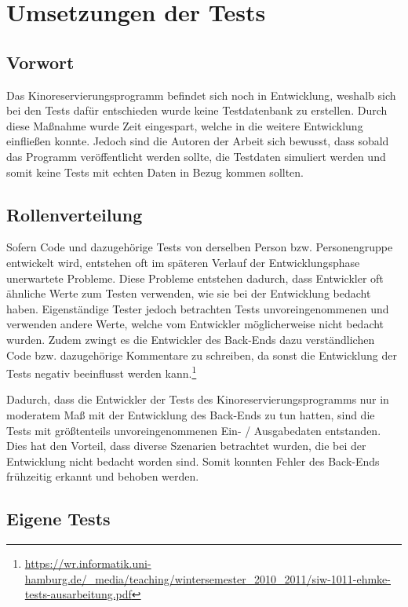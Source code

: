 \section{Umsetzungen der Tests}
\authorsection{\authorRF}

\subsection{Vorwort}

Das Kinoreservierungsprogramm befindet sich noch in Entwicklung, weshalb sich bei den Tests dafür entschieden wurde keine Testdatenbank zu erstellen.
Durch diese Maßnahme wurde Zeit eingespart, welche in die weitere Entwicklung einfließen konnte.
Jedoch sind die Autoren der Arbeit sich bewusst, dass sobald das Programm veröffentlicht werden sollte, die Testdaten simuliert werden und somit keine Tests mit echten Daten in Bezug kommen sollten.

\subsection{Rollenverteilung}

Sofern Code und dazugehörige Tests von derselben Person bzw. Personengruppe entwickelt wird, entstehen oft im späteren Verlauf der Entwicklungsphase unerwartete Probleme. Diese Probleme entstehen dadurch, dass Entwickler oft ähnliche Werte zum Testen verwenden, wie sie bei der Entwicklung bedacht haben.
Eigenständige Tester jedoch betrachten Tests unvoreingenommenen und verwenden andere Werte, welche vom Entwickler möglicherweise nicht bedacht wurden.
Zudem zwingt es die Entwickler des Back-Ends dazu verständlichen Code bzw. dazugehörige Kommentare zu schreiben, da sonst die Entwicklung der Tests negativ beeinflusst werden kann.\footnote{\url{https://wr.informatik.uni-hamburg.de/_media/teaching/wintersemester_2010_2011/siw-1011-ehmke-tests-ausarbeitung.pdf}}

Dadurch, dass die Entwickler der Tests des Kinoreservierungsprogramms nur in moderatem Maß mit der Entwicklung des Back-Ends zu tun hatten, sind die Tests mit größtenteils unvoreingenommenen Ein- / Ausgabedaten entstanden.
Dies hat den Vorteil, dass diverse Szenarien betrachtet wurden, die bei der Entwicklung nicht bedacht worden sind.
Somit konnten Fehler des Back-Ends frühzeitig erkannt und behoben werden.


\subsection{Eigene Tests}

